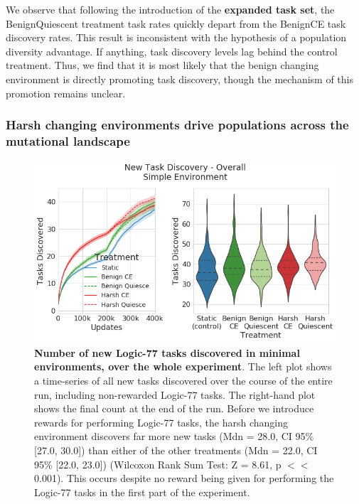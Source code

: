 \documentclass[10pt,letterpaper]{article}
\begin{document}
We observe that following the introduction of the \textbf{expanded task set}, the BenignQuiescent treatment task rates quickly depart from the BenignCE task discovery rates. This result is inconsistent with the hypothesis of a population diversity advantage. If anything, task discovery levels lag behind the control treatment. Thus, we find that it is most likely that the benign changing environment is directly promoting task discovery, though the mechanism of this promotion remains unclear.  

\subsubsection*{Harsh changing environments drive populations across the mutational landscape}
	\begin{figure}[!h]
	\includegraphics[width=0.95\columnwidth]{figures/LTE/lte-simple-overall_task_discovery.png}
	\caption{\textbf{Number of new Logic-77 tasks discovered in minimal environments, over the whole experiment}. The left plot shows a time-series of all new tasks discovered over the course of the entire run, including non-rewarded Logic-77 tasks. The right-hand plot shows the final count at the end of the run. Before we introduce rewards for performing Logic-77 tasks, the harsh changing environment discovers far more new tasks (Mdn = 28.0, CI 95\% [27.0, 30.0]) than either of the other treatments (Mdn = 22.0, CI 95\% [22.0, 23.0]) (Wilcoxon Rank Sum Test: Z = 8.61, p $<<$ 0.001). This occurs despite no reward being given for performing the Logic-77 tasks in the first part of the experiment. %
	}
	\label{fig:simple-overall_task_discovery}
	\end{figure}
\end{document}
